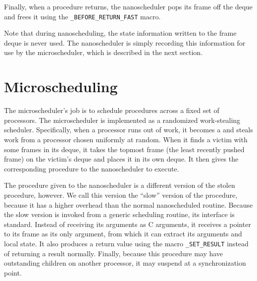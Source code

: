 
Finally, when a procedure returns, the nanoscheduler pops its frame
off the deque and frees it using the
\texttt{\_BEFORE\_RETURN\_FAST}
macro.

Note that during nanoscheduling, the state information written to the
frame deque is never used.  The nanoscheduler is simply recording
this information for use by the microscheduler, which is described in
the next section.

\section{Microscheduling}

The microscheduler's job is to schedule procedures across a fixed set
of processors.  The microscheduler is implemented as a randomized
work-stealing scheduler.  Specifically, when a processor runs out of
work, it becomes a 
and steals work from a
 processor chosen
uniformly at random.  When it finds a victim with some frames in its
deque, it takes the topmost frame (the least recently pushed frame) on
the victim's deque and places it in its own deque.  It then gives the
corresponding procedure to the nanoscheduler to execute.

 The procedure given to
the nanoscheduler is a different version of the stolen procedure,
however.  We call this version the ``slow'' version of the procedure,
because it has a higher overhead than the normal nanoscheduled
routine.  Because the slow version is invoked from a generic
scheduling routine, its interface is standard.  Instead of receiving
its arguments as C arguments, it receives a pointer to its frame as
its only argument, from which it can extract its arguments and local
state.  It also produces a return value using the macro
\texttt{\_SET\_RESULT}
instead of returning a result normally.  Finally, because this
procedure may have outstanding children on another processor, it may
suspend at a synchronization point.

